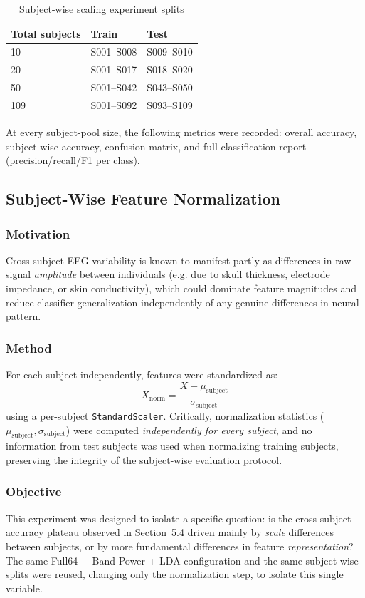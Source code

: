 \documentclass[11pt,a4paper]{article}
\newcommand{\code}[1]{\texttt{#1}}
\begin{document}
\begin{table}[h!]
\centering
\caption{Subject-wise scaling experiment splits}
\label{tab:scaling-splits}
\begin{tabular}{lll}
\toprule
\textbf{Total subjects} & \textbf{Train} & \textbf{Test} \\
\midrule
10  & S001--S008 & S009--S010 \\
20  & S001--S017 & S018--S020 \\
50  & S001--S042 & S043--S050 \\
109 & S001--S092 & S093--S109 \\
\bottomrule
\end{tabular}
\end{table}

At every subject-pool size, the following metrics were recorded: overall accuracy, subject-wise accuracy, confusion matrix, and full classification report (precision/recall/F1 per class).

\subsection{Subject-Wise Feature Normalization}

\subsubsection{Motivation}
Cross-subject EEG variability is known to manifest partly as differences in raw signal \emph{amplitude} between individuals (e.g. due to skull thickness, electrode impedance, or skin conductivity), which could dominate feature magnitudes and reduce classifier generalization independently of any genuine differences in neural pattern.

\subsubsection{Method}
For each subject independently, features were standardized as:
\[
X_{\text{norm}} = \frac{X - \mu_{\text{subject}}}{\sigma_{\text{subject}}}
\]
using a per-subject \code{StandardScaler}. Critically, normalization statistics ($\mu_{\text{subject}}, \sigma_{\text{subject}}$) were computed \emph{independently for every subject}, and no information from test subjects was used when normalizing training subjects, preserving the integrity of the subject-wise evaluation protocol.

\subsubsection{Objective}
This experiment was designed to isolate a specific question: is the cross-subject accuracy plateau observed in Section~5.4 driven mainly by \emph{scale} differences between subjects, or by more fundamental differences in feature \emph{representation}? The same Full64 + Band Power + LDA configuration and the same subject-wise splits were reused, changing only the normalization step, to isolate this single variable.
\end{document}
